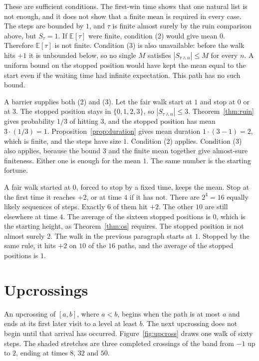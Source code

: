 These are sufficient conditions. The first-win time shows that one natural list is not enough, and it does not show that a finite mean is required in every case. The steps are bounded by $1$, and $\tau$ is finite almost surely by the ruin comparison above, but $S_\tau=1$. If $\mathbb E[\tau]$ were finite, condition (2) would give mean $0$. Therefore $\mathbb E[\tau]$ is not finite. Condition (3) is also unavailable: before the walk hits $+1$ it is unbounded below, so no single $M$ satisfies $|S_{\tau\wedge n}|\le M$ for every $n$. A uniform bound on the stopped position would have kept the mean equal to the start even if the waiting time had infinite expectation. This path has no such bound.

A barrier supplies both (2) and (3). Let the fair walk start at $1$ and stop at $0$ or at $3$. The stopped position stays in $\{0,1,2,3\}$, so $|S_{\tau\wedge n}|\le 3$. Theorem~\ref{thm:ruin} gives probability $1/3$ of hitting $3$, and the stopped position has mean $3\cdot(1/3)=1$. Proposition~\ref{prop:duration} gives mean duration $1\cdot(3-1)=2$, which is finite, and the steps have size $1$. Condition (2) applies. Condition (3) also applies, because the bound $3$ and the finite mean together give almost-sure finiteness. Either one is enough for the mean $1$. The same number is the starting fortune.

A fair walk started at $0$, forced to stop by a fixed time, keeps the mean. Stop at the first time it reaches $+2$, or at time $4$ if it has not. There are $2^4=16$ equally likely sequences of steps. Exactly $6$ of them hit $+2$. The other $10$ are still elsewhere at time $4$. The average of the sixteen stopped positions is $0$, which is the starting height, as Theorem~\ref{thm:os} requires. The stopped position is not almost surely $2$. The walk in the previous paragraph starts at $1$. Stopped by the same rule, it hits $+2$ on $10$ of the $16$ paths, and the average of the stopped positions is $1$.

\section{Upcrossings}

An upcrossing of $[a,b]$, where $a<b$, begins when the path is at most $a$ and ends at its first later visit to a level at least $b$. The next upcrossing does not begin until that arrival has occurred. Figure~\ref{fig:upcross} draws one walk of sixty steps. The shaded stretches are three completed crossings of the band from $-1$ up to $2$, ending at times $8$, $32$ and $50$.


